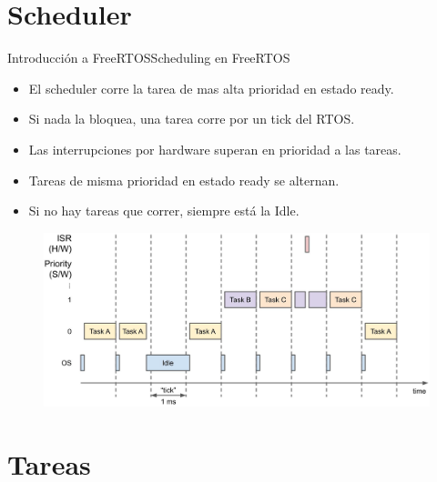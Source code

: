 \documentclass[aspectratio=169, xcolor=dvipsnames]{beamer}
\begin{document}
\section{Scheduler}
\begin{frame}{Introducción a FreeRTOS}{Scheduling en FreeRTOS}
\begin{itemize}
    \item El scheduler corre la tarea de mas alta prioridad en estado ready.
    \item Si nada la bloquea, una tarea corre por un tick del RTOS.
    \item Las interrupciones por hardware superan en prioridad a las tareas.
    \item Tareas de misma prioridad en estado ready se alternan.
    \item Si no hay tareas que correr, siempre está la Idle.
\end{itemize}
\begin{figure}
\centering
\includegraphics[width=0.5\linewidth]{resources/images/scheduling.png}
\end{figure}
\end{frame}

\section{Tareas}
\end{document}
